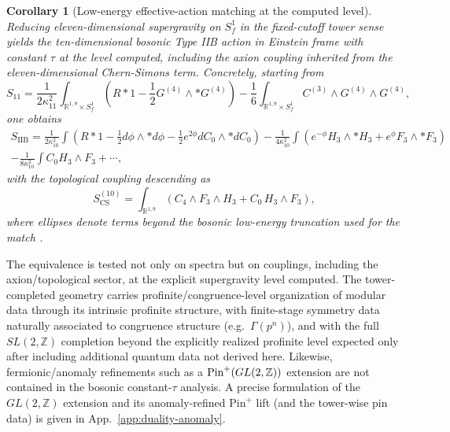 \documentclass[11pt]{article}
\newtheorem{corollary}[theorem]{Corollary}
\theoremstyle{remark}
\newcommand{\R}{\mathbb{R}}
\begin{document}
\begin{corollary}[Low-energy effective-action matching at the computed level] Reducing eleven-dimensional supergravity on \(S_f^{1}\) in the fixed-cutoff tower sense yields the ten-dimensional bosonic Type IIB action in Einstein frame with constant \(\tau\) at the level computed, including the axion coupling inherited from the eleven-dimensional Chern-Simons term. Concretely, starting from
\begin{equation} \label{eq:S11}
S_{11}=\frac1{2\kappa_{11}^{2}}\int_{\R^{1,9}\times S_f^{1}}\left(R*1-\frac12 G^{(4)}\wedge *G^{(4)}\right)-\frac16\int_{\R^{1,9}\times S_f^{1}}C^{(3)}\wedge G^{(4)}\wedge G^{(4)},
\end{equation}
one obtains
\begin{multline}\label{eq:SIIB}
S_{\mathrm{IIB}}=\frac1{2\kappa_{10}^{2}}\int\left(R*1-\frac12 d\phi\wedge *d\phi-\frac12 e^{2\phi}dC_{0}\wedge *dC_{0}\right)-\frac1{4\kappa_{10}^{2}}\int\left(e^{-\phi}H_{3}\wedge *H_{3}+e^{\phi}F_{3}\wedge *F_{3}\right)\\-\frac1{8\kappa_{10}^{2}}\int C_{0}H_{3}\wedge F_{3}+\cdots,
\end{multline}
with the topological coupling descending as
\begin{equation} \label{eq:CS10}
S_{\mathrm{CS}}^{(10)}=\int_{\R^{1,9}}\left(C_{4}\wedge F_{3}\wedge H_{3}+C_{0}\,H_{3}\wedge F_{3}\right),
\end{equation}
where ellipses denote terms beyond the bosonic low-energy truncation used for the match \cite{Schwarz1983, Schwarz1995}.
\end{corollary}

The equivalence is tested not only on spectra but on couplings, including the
axion/topological sector, at the explicit supergravity level computed. The
tower-completed geometry carries
profinite/\allowbreak congruence-level organization of modular data through its
intrinsic profinite structure, with finite-stage symmetry data naturally
associated to congruence structure (e.g.\ \(\Gamma(p^{n})\)), and with the full
\(SL(2,\mathbb{Z})\) completion beyond the explicitly realized profinite level
expected only after including additional quantum data not derived here.
Likewise, fermionic/anomaly refinements such as a
\({\rm Pin}^{+}\!\left(GL(2,\mathbb{Z})\right)\) extension are not contained in the
bosonic constant-\(\tau\) analysis. A precise formulation of the $GL(2,\mathbb{Z})$ extension and its anomaly-refined $\mathrm{Pin}^+$ lift (and the tower-wise pin data) is given in App.~\ref{app:duality-anomaly}.
\end{document}
